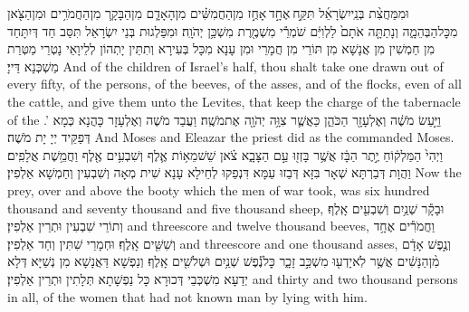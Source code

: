 {וּמִמַּחֲצִ֨ת בְּנֵֽי\maqqaf יִשְׂרָאֵ֜ל תִּקַּ֣ח \legarmeh  אֶחָ֣ד \legarmeh  אָחֻ֣ז מִן\maqqaf הַחֲמִשִּׁ֗ים מִן\maqqaf הָאָדָ֧ם מִן\maqqaf הַבָּקָ֛ר מִן\maqqaf הַחֲמֹרִ֥ים וּמִן\maqqaf הַצֹּ֖אן מִכׇּל\maqqaf הַבְּהֵמָ֑ה וְנָתַתָּ֤ה אֹתָם֙ לַלְוִיִּ֔ם שֹׁמְרֵ֕י מִשְׁמֶ֖רֶת מִשְׁכַּ֥ן יְהֹוָֽה׃}
{וּמִפַּלְגוּת בְּנֵי יִשְׂרָאֵל תִּסַּב חַד דְּיִתָּחַד מִן חַמְשִׁין מִן אֲנָשָׁא מִן תּוֹרֵי מִן חֲמָרֵי וּמִן עָנָא מִכָּל בְּעִירָא וְתִתֵּין יָתְהוֹן לְלֵיוָאֵי נָטְרֵי מַטְּרַת מַשְׁכְּנָא דַּייָ׃}
{And of the children of Israel’s half, thou shalt take one drawn out of every fifty, of the persons, of the beeves, of the asses, and of the flocks, even of all the cattle, and give them unto the Levites, that keep the charge of the tabernacle of the \lord.’}{}
{וַיַּ֣עַשׂ מֹשֶׁ֔ה וְאֶלְעָזָ֖ר הַכֹּהֵ֑ן כַּאֲשֶׁ֛ר צִוָּ֥ה יְהֹוָ֖ה אֶת\maqqaf מֹשֶֽׁה׃}
{וַעֲבַד מֹשֶׁה וְאֶלְעָזָר כָּהֲנָא כְּמָא דְּפַקֵּיד יְיָ יָת מֹשֶׁה׃}
{And Moses and Eleazar the priest did as the \lord\space commanded Moses.}{}
{וַיְהִי֙ הַמַּלְק֔וֹחַ יֶ֣תֶר הַבָּ֔ז אֲשֶׁ֥ר בָּזְז֖וּ עַ֣ם הַצָּבָ֑א צֹ֗אן שֵׁשׁ\maqqaf מֵא֥וֹת אֶ֛לֶף וְשִׁבְעִ֥ים אֶ֖לֶף וַחֲמֵ֥שֶׁת אֲלָפִֽים׃}
{וַהֲוָת דְּבַרְתָּא שְׁאָר בִּזָּא דְּבַזוּ עַמָּא דִּנְפַקוּ לְחֵילָא עָנָא שִׁית מְאָה וְשִׁבְעִין וְחַמְשָׁא אַלְפִין׃}
{Now the prey, over and above the booty which the men of war took, was six hundred thousand and seventy thousand and five thousand sheep,}{}
{וּבָקָ֕ר שְׁנַ֥יִם וְשִׁבְעִ֖ים אָֽלֶף׃}
{וְתוֹרֵי שִׁבְעִין וּתְרֵין אַלְפִין׃}
{and threescore and twelve thousand beeves,}{}
{וַחֲמֹרִ֕ים אֶחָ֥ד וְשִׁשִּׁ֖ים אָֽלֶף׃}
{וּחְמָרֵי שִׁתִּין וְחַד אַלְפִין׃}
{and threescore and one thousand asses,}{}
{וְנֶ֣פֶשׁ אָדָ֔ם מִ֨ן\maqqaf הַנָּשִׁ֔ים אֲשֶׁ֥ר לֹֽא\maqqaf יָדְע֖וּ מִשְׁכַּ֣ב זָכָ֑ר כׇּל\maqqaf נֶ֕פֶשׁ שְׁנַ֥יִם וּשְׁלֹשִׁ֖ים אָֽלֶף׃}
{וְנַפְשָׁא דַּאֲנָשָׁא מִן נְשַׁיָּא דְּלָא יְדַעָא מִשְׁכְּבֵי דְּכוּרָא כָּל נַפְשָׁתָא תְּלָתִין וּתְרֵין אַלְפִין׃}
{and thirty and two thousand persons in all, of the women that had not known man by lying with him.}{}
